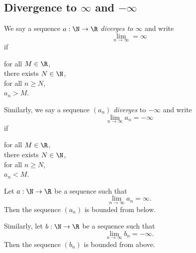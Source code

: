 \subsection{Divergence to $\infty$ and $-\infty$}
\begin{definition}
    We say a sequence $a: \N \to \R$ \emph{diverges to $\infty$} and write 
    $$\lim_{n\to\infty} = \infty$$
    if
    \begin{center}
        \parbox{\linewidth}{
        \linewidth
        for all $M \in \R$, \\
        \tab there exists $N \in \N$, \\
        \tab\tab for all $n \ge N$, \\
        \tab\tab\tab $a_n > M$.
        }
    \end{center}

    Similarly, we say a sequence $(a_n)$ \emph{diverges} to $-\infty$ and write
    $$\lim_{n\to\infty}a_n = -\infty$$
    if
    \begin{center}
        \parbox{\linewidth}{
        \linewidth
        for all $M \in \R$, \\
        \tab there exists $N \in \N$, \\
        \tab\tab for all $n \ge N$, \\
        \tab\tab\tab $a_n < M$.
        }
    \end{center}
\end{definition}

\begin{proposition}
    Let $a: \N \to \R$ be a sequence such that 
    $$\lim_{n\to\infty}a_n = \infty.$$
    Then the sequence $(a_n)$ is bounded from below.

    Similarly, let $b: \N \to \R$ be a sequence such that 
    $$\lim_{n\to\infty}b_n = -\infty.$$
    Then the sequence $(b_n)$ is bounded from above.
\end{proposition}

